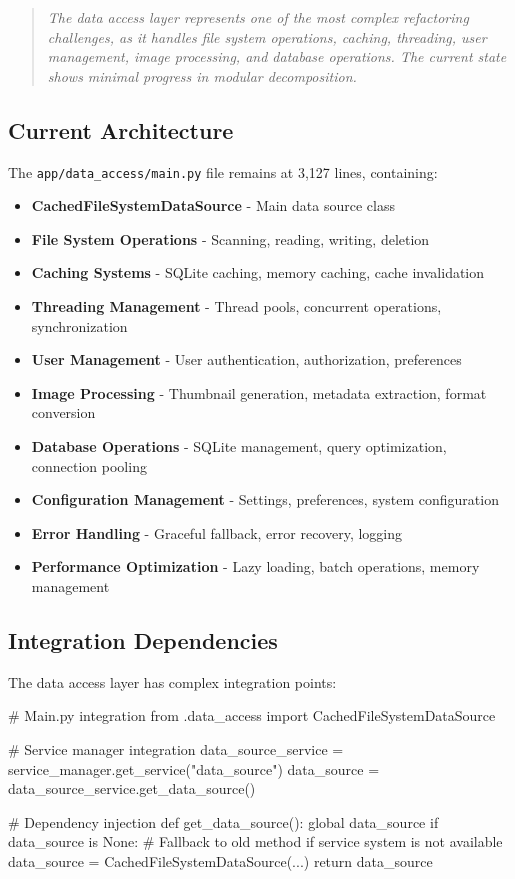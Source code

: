 \documentclass[11pt]{article}
\begin{document}
\begin{quote}
\emph{The data access layer represents one of the most complex refactoring challenges, as it handles file system operations, caching, threading, user management, image processing, and database operations. The current state shows minimal progress in modular decomposition.}
\end{quote}

\subsection{Current Architecture}

The \texttt{app/data\_access/main.py} file remains at 3,127 lines, containing:

\begin{itemize}
\item \textbf{CachedFileSystemDataSource} - Main data source class
\item \textbf{File System Operations} - Scanning, reading, writing, deletion
\item \textbf{Caching Systems} - SQLite caching, memory caching, cache invalidation
\item \textbf{Threading Management} - Thread pools, concurrent operations, synchronization
\item \textbf{User Management} - User authentication, authorization, preferences
\item \textbf{Image Processing} - Thumbnail generation, metadata extraction, format conversion
\item \textbf{Database Operations} - SQLite management, query optimization, connection pooling
\item \textbf{Configuration Management} - Settings, preferences, system configuration
\item \textbf{Error Handling} - Graceful fallback, error recovery, logging
\item \textbf{Performance Optimization} - Lazy loading, batch operations, memory management
\end{itemize}

\subsection{Integration Dependencies}

The data access layer has complex integration points:

\begin{typescriptcode}
# Main.py integration
from .data_access import CachedFileSystemDataSource

# Service manager integration
data_source_service = service_manager.get_service("data_source")
data_source = data_source_service.get_data_source()

# Dependency injection
def get_data_source():
    global data_source
    if data_source is None:
        # Fallback to old method if service system is not available
        data_source = CachedFileSystemDataSource(...)
    return data_source
\end{typescriptcode}
\end{document}
